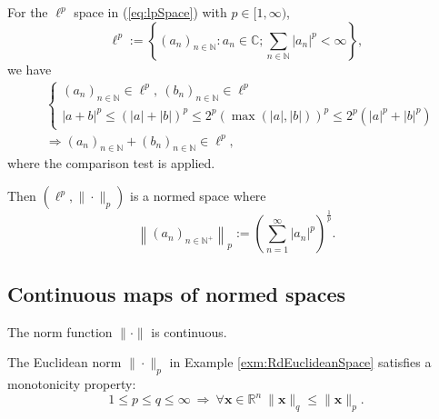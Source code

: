 \begin{exm}
  For the $\ell^{p}$ space in (\ref{eq:lpSpace})
  with $p\in [1,\infty)$,
  \begin{displaymath}
    \ell^p := \left\{
      (a_n)_{n\in \mathbb{N}}: a_n\in \mathbb{C};
      \sum_{n\in \mathbb{N}} |a_n|^p < \infty
    \right\}, 
  \end{displaymath}
  we have
  \begin{align*}
     &\left\{
    \begin{array}{l}
      (a_n)_{n\in \mathbb{N}}\in \ell^p, \  
      (b_n)_{n\in \mathbb{N}}\in \ell^p
    \\
      |a+b|^p \le (|a|+|b|)^p \le 2^p(\max(|a|,|b|))^p
                  \le 2^p(|a|^p+|b|^p)
    \end{array}
    \right.
    \\
    &\Rightarrow
     (a_n)_{n\in \mathbb{N}}+(b_n)_{n\in \mathbb{N}}\in \ell^p,
  \end{align*}
  where the comparison test is applied.

  Then $(\ell^{p}, \|\cdot\|_{p})$
  is a normed space where
  \begin{equation}
    \label{eq:ellPNorm}
    \left\|(a_n)_{n\in \mathbb{N}^+}\right\|_p
    := \left(\sum_{n=1}^{\infty} |a_n|^p\right)^{\frac{1}{p}}.
  \end{equation}
\end{exm}

\subsection{Continuous maps of normed spaces}

\begin{lem}
  \label{lem:normIsContinuousMap}
  The norm function $\|\cdot\|$ is continuous.
\end{lem}

\begin{lem}
  \label{lem:monotonicityOfEuclideanNorm}
  The Euclidean norm $\|\cdot\|_p$
  in Example \ref{exm:RdEuclideanSpace}
  satisfies a monotonicity property:
  \begin{equation}
    \label{eq:monotonicityOfEuclideanNorm}
    1\le p \le q \le \infty
    \ \Rightarrow\
    \forall \mathbf{x}\in \mathbb{R}^n\ 
    \|\mathbf{x}\|_q \le \|\mathbf{x}\|_p.
  \end{equation}
\end{lem}

